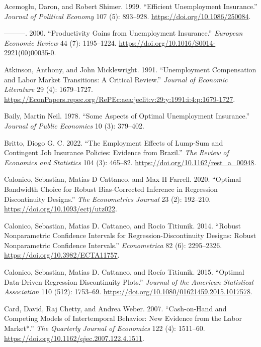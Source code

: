 \documentclass[
  4pt,
]{report}
\newlength{\cslhangindent}
\newenvironment{CSLReferences}[2] %
 {\begin{list}{}{%
  \setlength{\itemindent}{0pt}
  \setlength{\leftmargin}{0pt}
  \setlength{\parsep}{0pt}
  \ifodd #1
   \setlength{\leftmargin}{\cslhangindent}
   \setlength{\itemindent}{-1\cslhangindent}
  \fi
  \setlength{\itemsep}{#2\baselineskip}}}
 {\end{list}}
\begin{document}
\label{refs}
\begin{CSLReferences}{1}{0}
Acemoglu, Daron, and Robert Shimer. 1999. {``Efficient Unemployment
Insurance.''} \emph{Journal of Political Economy} 107 (5): 893--928.
\url{https://doi.org/10.1086/250084}.

---------. 2000. {``Productivity Gains from Unemployment Insurance.''}
\emph{European Economic Review} 44 (7): 1195--1224.
\url{https://doi.org/10.1016/S0014-2921(00)00035-0}.

Atkinson, Anthony, and John Micklewright. 1991. {``Unemployment
Compensation and Labor Market Transitions: A Critical Review.''}
\emph{Journal of Economic Literature} 29 (4): 1679--1727.
\url{https://EconPapers.repec.org/RePEc:aea:jeclit:v:29:y:1991:i:4:p:1679-1727}.

Baily, Martin Neil. 1978. {``Some Aspects of Optimal Unemployment
Insurance.''} \emph{Journal of Public Economics} 10 (3): 379--402.

Britto, Diogo G. C. 2022. {``The Employment Effects of Lump-Sum and
Contingent Job Insurance Policies: Evidence from Brazil.''} \emph{The
Review of Economics and Statistics} 104 (3): 465--82.
\url{https://doi.org/10.1162/rest_a_00948}.

Calonico, Sebastian, Matias D Cattaneo, and Max H Farrell. 2020.
{``Optimal Bandwidth Choice for Robust Bias-Corrected Inference in
Regression Discontinuity Designs.''} \emph{The Econometrics Journal} 23
(2): 192--210. \url{https://doi.org/10.1093/ectj/utz022}.

Calonico, Sebastian, Matias D. Cattaneo, and Rocio Titiunik. 2014.
{``Robust Nonparametric Confidence Intervals for
Regression-Discontinuity Designs: Robust Nonparametric Confidence
Intervals.''} \emph{Econometrica} 82 (6): 2295--2326.
\url{https://doi.org/10.3982/ECTA11757}.

Calonico, Sebastian, Matias D. Cattaneo, and Rocío Titiunik. 2015.
{``Optimal Data-Driven Regression Discontinuity Plots.''} \emph{Journal
of the American Statistical Association} 110 (512): 1753--69.
\url{https://doi.org/10.1080/01621459.2015.1017578}.

Card, David, Raj Chetty, and Andrea Weber. 2007. {``Cash-on-Hand and
Competing Models of Intertemporal Behavior: New Evidence from the Labor
Market*.''} \emph{The Quarterly Journal of Economics} 122 (4): 1511--60.
\url{https://doi.org/10.1162/qjec.2007.122.4.1511}.


\end{CSLReferences}
\end{document}
